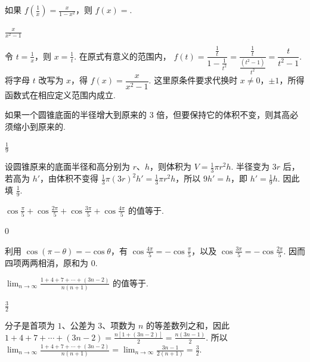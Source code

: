\documentclass[UTF8,a4paper,oneside,11pt]{ctexbook}
\begin{document}
\begin{problem}

如果 \(f\left(\frac{1}{x}\right)=\frac{x}{1-x^{2}}\)，则 \(f(x)=\)\fillinblank{}.
\begin{answer}
\(\frac{x}{x^{2}-1}\)
\end{answer}

\begin{solution}
令 \(t=\frac1x\)，则 \(x=\frac1t\). 在原式有意义的范围内，
\(f(t)=\dfrac{\frac{1}{t}}{1-\frac{1}{t^{2}}}=\dfrac{\frac{1}{t}}{\frac{(t^{2}-1)}{t^{2}}}=\dfrac{t}{t^{2}-1}\). 将字母 \(t\) 改写为 \(x\)，得 \(f(x)=\dfrac{x}{x^{2}-1}\). 这里原条件要求代换时 \(x\ne0\)，\(\pm1\)，所得函数式在相应定义范围内成立.
\end{solution}
\end{problem}

\begin{problem}

如果一个圆锥底面的半径增大到原来的 3 倍，但要保持它的体积不变，则其高必须缩小到原来的\fillinblank{}.
\begin{answer}
\(\frac{1}{9}\)
\end{answer}

\begin{solution}
设圆锥原来的底面半径和高分别为 \(r\)、\(h\)，则体积为 \(V=\frac13\pi r^{2}h\). 半径变为 \(3r\) 后，若高为 \(h'\)，由体积不变得
\(\frac13\pi(3r)^{2}h'=\frac13\pi r^{2}h\)，所以 \(9h'=h\)，即 \(h'=\frac19h\). 因此填 \(\frac19\).
\end{solution}
\end{problem}

\begin{problem}

\(\cos \frac{\pi}{5} + \cos \frac{2\pi}{5} + \cos \frac{3\pi}{5} + \cos \frac{4\pi}{5}\) 的值等于\fillinblank{}.
\begin{answer}
\(0\)
\end{answer}

\begin{solution}
利用 \(\cos(\pi-\theta)=-\cos\theta\)，有 \(\cos\frac{4\pi}{5}=-\cos\frac{\pi}{5}\)，以及 \(\cos\frac{3\pi}{5}=-\cos\frac{2\pi}{5}\). 因而四项两两相消，原和为 \(0\).
\end{solution}
\end{problem}

\begin{problem}

\(\displaystyle\lim_{n\to\infty}\frac{1 + 4 + 7 + \cdots + (3n - 2)}{n(n + 1)}\) 的值等于\fillinblank{}.
\begin{answer}
\(\frac{3}{2}\)
\end{answer}

\begin{solution}
分子是首项为 \(1\)、公差为 \(3\)、项数为 \(n\) 的等差数列之和，因此
\(1+4+7+\cdots+(3n-2)=\frac{n[1+(3n-2)]}{2}=\frac{n(3n-1)}{2}\). 所以
\(\displaystyle\lim_{n\to\infty}\frac{1+4+7+\cdots+(3n-2)}{n(n+1)}=\lim_{n\to\infty}\frac{3n-1}{2(n+1)}=\frac32\).
\end{solution}
\end{problem}
\end{document}
